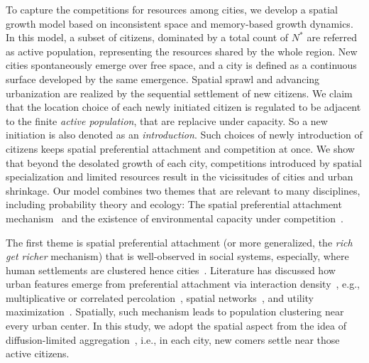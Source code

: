 To capture the competitions for resources among cities, we develop a spatial growth model based on inconsistent space and memory-based growth dynamics. In this model, a subset of citizens, dominated by a total count of $N^*$ are referred as active population, representing the resources shared by the whole region. New cities spontaneously emerge over free space, and a city is defined as a continuous surface developed by the same emergence. Spatial sprawl and advancing urbanization are realized by the sequential settlement of new citizens. We claim that the location choice of each newly initiated citizen is regulated to be adjacent to the finite \textit{active population}, that are replacive under capacity. So a new initiation is also denoted as an \textit{introduction}. Such choices of newly introduction of citizens keeps spatial preferential attachment and competition at once. We show that beyond the desolated growth of each city, competitions introduced by spatial specialization and limited resources result in the vicissitudes of cities and urban shrinkage. Our model combines two themes that are relevant to many disciplines, including probability theory and ecology: The spatial preferential attachment mechanism~\cite{Li2017Simple} and the existence of environmental capacity under competition~\cite{gude2020bacterial,liu2019an}. 

The first theme is spatial preferential attachment (or more generalized, the \textit{rich get richer} mechanism) that is well-observed in social systems, especially, where human settlements are clustered hence cities~\cite{marsili1998interacting}. Literature has discussed how urban features emerge from preferential attachment via interaction density~\cite{ccolak2016understanding,louf2014congestion,fujita1976spatial}, e.g., multiplicative or correlated percolation~\cite{makse1995modelling,PhysRevE.58.7054,rybski2013distance}, spatial networks~\cite{marsili1998interacting,court2013origins,Li2017Simple}, and utility maximization~\cite{PhysRevE.90.042815,axtell2001emergent}. Spatially, such mechanism leads to population clustering near every urban center. In this study, we adopt the spatial aspect from the idea of diffusion-limited aggregation~\cite{makse1995modelling, rybski2013distance, kleinberg2000navigation}, i.e., in each city, new comers settle near those active citizens.

